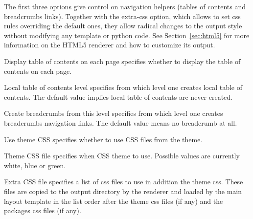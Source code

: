The first three options give control on navigation helpers (tables of
contents and breadcrumbs links). Together with the extra-css option,
which allows to set css rules overriding the default ones, they allow
radical changes to the output style without modifying any template or
python code. See Section~\ref{sec:html5} for more information on the
HTML5 renderer and how to customize its output.

\begin{configuration}{Display table of contents on each page}
specifies whether to display the table of contents on each page.
\end{configuration}


\begin{configuration}{Local table of contents level}
specifies from which level one creates local table of contents. The
default value implies local table of contents are never created.
\end{configuration}


\begin{configuration}{Create breadcrumbs from this level}
specifies from which level one creates breadcrumbs navigation links.
The default value means no breadcrumb at all.
\end{configuration}

\begin{configuration}{Use theme CSS}
specifies whether to use CSS files from the theme.
\end{configuration}

\begin{configuration}{Theme CSS file}
specifies when CSS theme to use. Possible values are currently white, blue or
green.
\end{configuration}

\begin{configuration}{Extra CSS file}
specifies a list of css files to use in addition the
theme css. These files are copied to the output directory by the
renderer and loaded by the main layout template in the list order after
the theme css files (if any) and the packages css files (if any).
\end{configuration}

